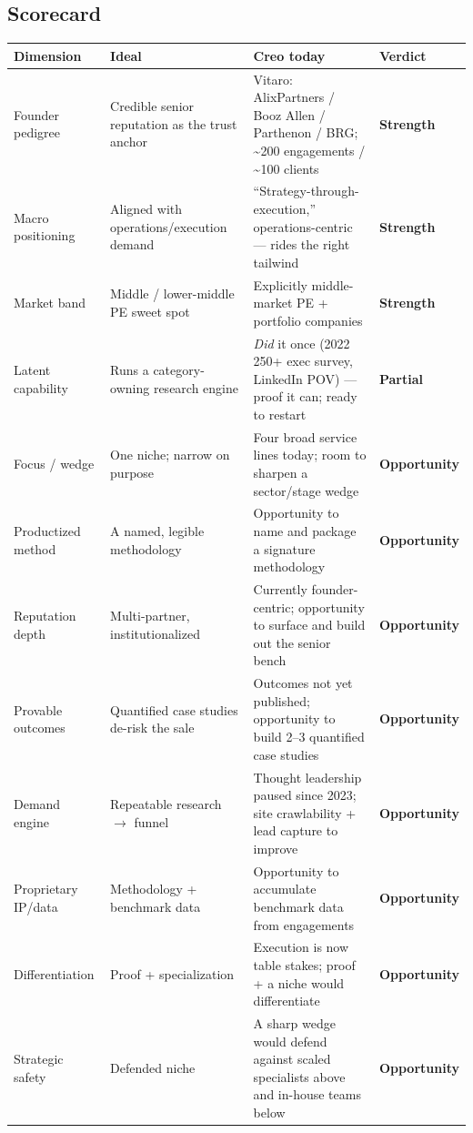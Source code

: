 \documentclass[11pt]{article}
\newcommand{\rgood}{\textcolor{green!50!black}{\textbf{Strength}}}
\newcommand{\rmid}{\textcolor{orange!85!black}{\textbf{Partial}}}
\newcommand{\rgap}{\textcolor{blue!55!black}{\textbf{Opportunity}}}
\begin{document}
\subsection{Scorecard}
\begin{center}
\renewcommand{\arraystretch}{1.3}\small
\begin{tabular}{p{2.3cm} p{4.7cm} p{5.3cm} p{1.9cm}}
\toprule
\textbf{Dimension} & \textbf{Ideal} & \textbf{Creo today} & \textbf{Verdict} \\
\midrule
Founder pedigree & Credible senior reputation as the trust anchor & Vitaro: AlixPartners / Booz Allen / Parthenon / BRG; \textasciitilde{}200 engagements / \textasciitilde{}100 clients & \rgood \\
Macro positioning & Aligned with operations/execution demand & ``Strategy-through-execution,'' operations-centric --- rides the right tailwind & \rgood \\
Market band & Middle / lower-middle PE sweet spot & Explicitly middle-market PE + portfolio companies & \rgood \\
Latent capability & Runs a category-owning research engine & \emph{Did} it once (2022 250+ exec survey, LinkedIn POV) --- proof it can; ready to restart & \rmid \\
Focus / wedge & One niche; narrow on purpose & Four broad service lines today; room to sharpen a sector/stage wedge & \rgap \\
Productized method & A named, legible methodology & Opportunity to name and package a signature methodology & \rgap \\
Reputation depth & Multi-partner, institutionalized & Currently founder-centric; opportunity to surface and build out the senior bench & \rgap \\
Provable outcomes & Quantified case studies de-risk the sale & Outcomes not yet published; opportunity to build 2--3 quantified case studies & \rgap \\
Demand engine & Repeatable research $\to$ funnel & Thought leadership paused since 2023; site crawlability + lead capture to improve & \rgap \\
Proprietary IP/data & Methodology + benchmark data & Opportunity to accumulate benchmark data from engagements & \rgap \\
Differentiation & Proof + specialization & Execution is now table stakes; proof + a niche would differentiate & \rgap \\
Strategic safety & Defended niche & A sharp wedge would defend against scaled specialists above and in-house teams below & \rgap \\
\bottomrule
\end{tabular}
\end{center}
\end{document}
